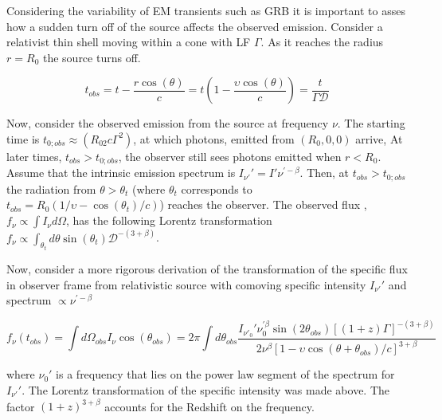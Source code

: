 
Considering the variability of \ac{EM} transients such as \ac{GRB} it is important to asses how a sudden turn off of the source affects the observed emission. 
Consider a relativist thin shell moving within a cone with \ac{LF} $\Gamma$. As it reaches the radius $r=R_0$ the source turns off. 

\begin{equation}
t_{obs} = t - \frac{r \cos(\theta)}{c} = t(1-\frac{\upsilon\cos(\theta)}{c}) = \frac{t}{\Gamma\mathcal{D}}
\end{equation}

Now, consider the observed emission from the source at frequency $\nu$. The starting time is $t_{0;obs}\approx(R_02c\Gamma^2)$, at which photons, emitted from $(R_0,0,0)$ arrive, At later times, $t_{obs}>t_{0;obs}$, the observer still sees photons emitted when $r < R_0$. 
Assume that the intrinsic emission spectrum is $I_{\nu'}' = I'\nu^{'-\beta}$.
Then, at $t_{obs} > t_{0;obs}$ the radiation from $\theta > \theta_t$ (where $\theta_t$ corresponds to $t_{obs} = R_0(1/\upsilon - \cos(\theta_t)/c)$) reaches the observer.
The observed flux \eg, $f_{\nu} \propto \int I_{\nu} d\Omega$, has the following Lorentz transformation $f_{\nu}\propto\int_{\theta_t} d\theta \sin(\theta_t) \mathcal{D}^{-(3+\beta)}$.

Now, consider a more rigorous derivation of the transformation of the specific flux in observer frame from relativistic source with comoving specific intensity $I_{\nu'}'$ and spectrum $\propto \nu^{' -\beta}$

\begin{equation}
f_{\nu}(t_{obs}) = \int d\Omega_{obs} I_{\nu} \cos(\theta_{obs}) = 2\pi \int d\theta_{obs} \frac{ I_{\nu'_0}' \nu_{0}^{'\beta}\sin(2\theta_{obs})[(1+z)\Gamma]^{-(3+\beta)} }{ 2\nu^{\beta} [ 1-\upsilon\cos(\theta + \theta_{obs}) / c ]^{3+\beta} }
\end{equation}

where $\nu_0 '$ is a frequency that lies on the power law segment of the spectrum for $I_{\nu'}'$. The Lorentz transformation of the specific intensity was made above. The factor $(1+z)^{3+\beta}$ accounts for the Redshift on the frequency. 

